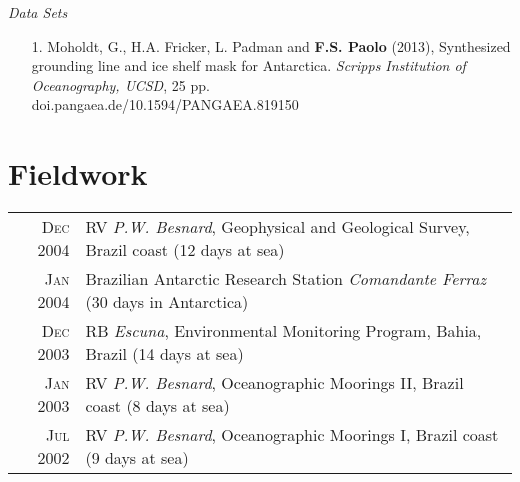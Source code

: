 \documentclass[a4paper,11pt]{article}
\begin{document}
\emph{Data Sets}

\begin{minipage}{0.98\textwidth}
\begin{enumerate}
  \item [1.] Moholdt, G., H.A. Fricker, L. Padman and {\bf F.S. Paolo} (2013), 
        Synthesized grounding line and ice shelf mask for Antarctica.
        {\it Scripps Institution of Oceanography, UCSD}, 25 pp.\\
        doi.pangaea.de/10.1594/PANGAEA.819150
\end{enumerate}
\end{minipage}


\section{Fieldwork}

\begin{tabular}{rl}
\textsc{Dec} 2004 & RV \emph{P.W. Besnard}, Geophysical and Geological Survey, Brazil coast \footnotesize{(12 days at sea)}\\
\textsc{Jan} 2004 & Brazilian Antarctic Research Station \emph{Comandante Ferraz} \footnotesize{(30 days in Antarctica)}\\
\textsc{Dec} 2003 & RB \emph{Escuna}, Environmental Monitoring Program, Bahia, Brazil \footnotesize{(14 days at sea)}\\
\textsc{Jan} 2003 & RV \emph{P.W. Besnard}, Oceanographic Moorings II, Brazil coast \footnotesize{(8 days at sea)}\\
\textsc{Jul} 2002 & RV \emph{P.W. Besnard}, Oceanographic Moorings I, Brazil coast \footnotesize{(9 days at sea)}
\end{tabular}


%
\end{document}

